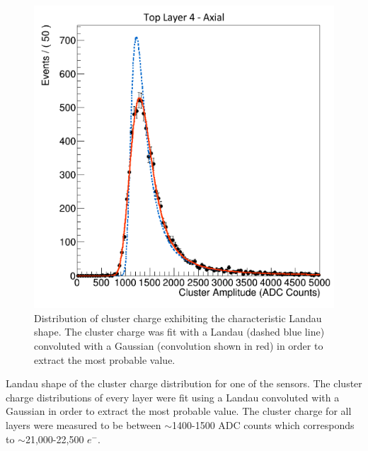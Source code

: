 \begin{figure}[h!t]
    \centering
    \includegraphics[width=.7\textwidth]{images/top_layer4_axial_cluster_charge.png}
    \caption{Distribution of cluster charge exhibiting the characteristic Landau
    shape.  The cluster charge was fit with a Landau (dashed blue line) convoluted
with a Gaussian (convolution shown in red) in order to extract the most probable value.}
    \label{fig:cluster_charge}
\end{figure}  
Landau shape of the cluster charge distribution for one of the sensors.
The cluster charge distributions of every layer were fit using a Landau
convoluted with a Gaussian in order to extract the most probable value.  The 
cluster charge for all layers were measured to be between $\sim$1400-1500 ADC counts
which corresponds to $\sim$21,000-22,500 $e^{-}$.  

